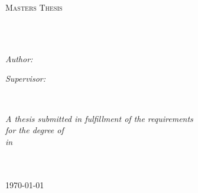 \documentclass[
11pt, 
english,
singlespacing,
headsepline,
]{MastersDoctoralThesis}
\author{firstName \textsc{lastName}}
\begin{document}
\frontmatter

\pagestyle{plain} 


\begin{titlepage}
\begin{center}

\vspace*{.06\textheight}
{\scshape\LARGE \univname\par}\vspace{1.5cm} %
\textsc{\Large Masters Thesis}\\[0.5cm]      %

\HRule \\[0.4cm]                            %
{\huge \bfseries \ttitle\par}\vspace{0.4cm} %
\HRule \\[1.5cm]                            %
 
\begin{minipage}[t]{0.4\textwidth}
\begin{flushleft} \large
\emph{Author:}\\

\authorname
\end{flushleft}
\end{minipage}
\begin{minipage}[t]{0.4\textwidth}
\begin{flushright} \large
\emph{Supervisor:} \\

\supname
\end{flushright}
\end{minipage}\\[3cm]
 
\vfill

\large \textit{A thesis submitted in fulfillment of the requirements\\ for the degree of
\degreename}\\[0.3cm]
\textit{in}\\[0.4cm]
\groupname\\\deptname\\[2cm]
 
\vfill

{\large \today}\\[4cm]
 
\vfill
\end{center}
\end{titlepage}
\end{document}
